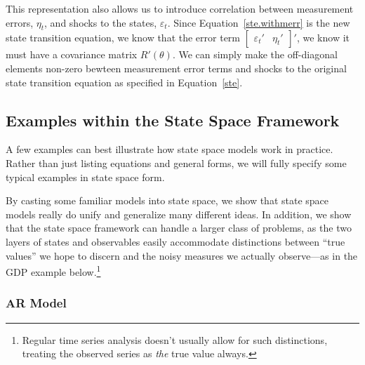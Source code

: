 \documentclass[a4paper,12pt]{article}
\begin{document}
This representation also allows us to introduce correlation between
measurement errors, $\eta_t$, and shocks to the states, $\varepsilon_t$.
Since Equation~\ref{ste.withmerr} is the new state transition equation,
we know that the error term $\begin{bmatrix} \varepsilon_t' & \eta_t'
\end{bmatrix}'$, we know it must have a covariance matrix $R'(\theta)$.
We can simply make the off-diagonal elements non-zero bewteen
measurement error terms and shocks to the original state transition
equation as specified in Equation~\ref{ste}.

\subsection{Examples within the State Space Framework}

A few examples can best illustrate how state space models work in practice. Rather than just listing equations and general forms, we will fully specify some typical examples in state space form.

By casting some familiar models into state space, we show that state space models really do unify and generalize many different ideas. In addition, we show that the state space framework can handle a larger class of problems, as the two layers of states and observables easily accommodate distinctions between ``true values'' we hope to discern and the noisy measures we actually observe---as in the GDP example below.\footnote{Regular time series analysis doesn't usually allow for such distinctions, treating the observed series as \emph{the} true value always.}

\subsubsection{AR Model}
\end{document}
